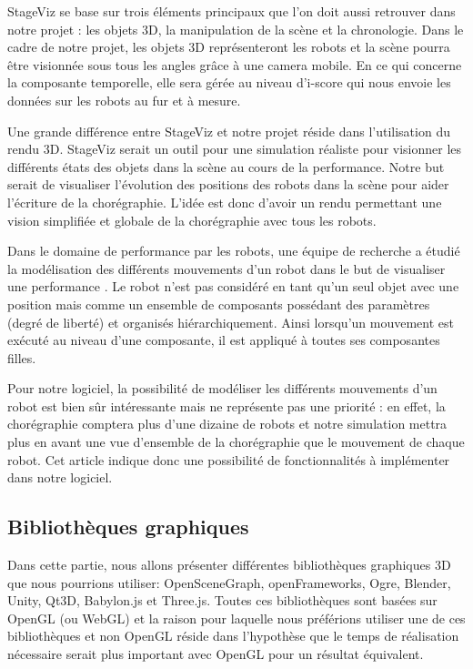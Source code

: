 StageViz se base sur trois éléments principaux que l'on doit aussi retrouver dans notre projet : les objets 3D, la manipulation de la scène et la chronologie. Dans le cadre de notre projet, les objets 3D représenteront les robots et la scène pourra être visionnée sous tous les angles grâce à une camera mobile. En ce qui concerne la composante temporelle, elle sera gérée au niveau d'i-score qui nous envoie les données sur les robots au fur et à mesure. 

Une grande différence entre StageViz et notre projet réside dans l'utilisation du rendu 3D. StageViz serait un outil pour une simulation réaliste pour visionner les différents états des objets dans la scène au cours de la performance. Notre but serait de visualiser l'évolution des positions des robots dans la scène pour aider l'écriture de la chorégraphie. L'idée est donc d'avoir un rendu permettant une vision simplifiée et globale de la chorégraphie avec tous les robots.

Dans le domaine de performance par les robots, une équipe de recherche a étudié la modélisation des différents mouvements d'un robot dans le but de visualiser une performance \cite{robotArt}. Le robot n'est pas considéré en tant qu'un seul objet avec une position mais comme un ensemble de composants possédant des paramètres (degré de liberté) et organisés hiérarchiquement. Ainsi lorsqu'un mouvement est exécuté au niveau d'une composante, il est appliqué à toutes ses composantes filles.

Pour notre logiciel, la possibilité de modéliser les différents mouvements d'un robot est bien sûr intéressante mais ne représente pas une priorité : en effet, la chorégraphie comptera plus d'une dizaine de robots et notre simulation mettra plus en avant une vue d'ensemble de la chorégraphie que le mouvement de chaque robot. Cet article indique donc une possibilité de fonctionnalités à implémenter dans notre logiciel.

\subsection{Bibliothèques graphiques}
Dans cette partie, nous allons présenter différentes bibliothèques graphiques 3D que nous pourrions utiliser: OpenSceneGraph, openFrameworks, Ogre, Blender, Unity, Qt3D, Babylon.js et Three.js. Toutes ces bibliothèques sont basées sur OpenGL (ou WebGL) et la raison pour laquelle nous préférions utiliser une de ces bibliothèques et non OpenGL réside dans l'hypothèse que le temps de réalisation nécessaire serait plus important avec OpenGL pour un résultat équivalent.


